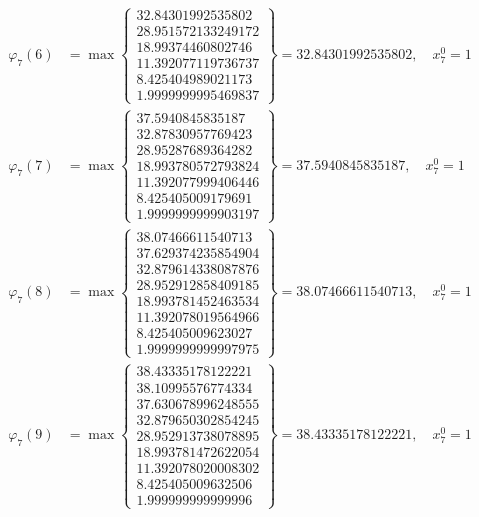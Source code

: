 \documentclass{article}
\begin{document}
\begin{align*}
  
\varphi_{7}(6) &= \max \left\{ \begin{array}{c}
32.84301992535802 \\
 28.951572133249172 \\
 18.99374460802746 \\
 11.392077119736737 \\
 8.425404989021173 \\
 1.9999999995469837
\end{array} \right\} = 32.84301992535802, \quad x_{7}^0 = 1\\
  
  
  
  
\varphi_{7}(7) &= \max \left\{ \begin{array}{c}
37.5940845835187 \\
 32.87830957769423 \\
 28.95287689364282 \\
 18.993780572793824 \\
 11.392077999406446 \\
 8.425405009179691 \\
 1.9999999999903197
\end{array} \right\} = 37.5940845835187, \quad x_{7}^0 = 1\\
  
  
  
  
\varphi_{7}(8) &= \max \left\{ \begin{array}{c}
38.07466611540713 \\
 37.629374235854904 \\
 32.879614338087876 \\
 28.952912858409185 \\
 18.993781452463534 \\
 11.392078019564966 \\
 8.425405009623027 \\
 1.9999999999997975
\end{array} \right\} = 38.07466611540713, \quad x_{7}^0 = 1\\
  
  
  
  
\varphi_{7}(9) &= \max \left\{ \begin{array}{c}
38.43335178122221 \\
 38.10995576774334 \\
 37.630678996248555 \\
 32.879650302854245 \\
 28.952913738078895 \\
 18.993781472622054 \\
 11.392078020008302 \\
 8.425405009632506 \\
 1.999999999999996
\end{array} \right\} = 38.43335178122221, \quad x_{7}^0 = 1\\
  

\end{align*}
\end{document}
